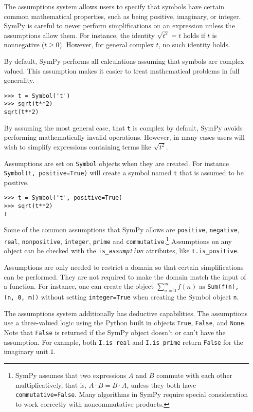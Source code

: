 The assumptions system allows users to specify that symbols have certain
common mathematical properties, such as being positive, imaginary, or
integer. SymPy is careful to never perform simplifications on an expression
unless the assumptions allow them. For instance, the identity $\sqrt{t^2} = t$
holds if $t$ is nonnegative ($t\ge 0$). However, for general complex $t$, no
such identity holds.

By default, SymPy performs all calculations assuming that symbols are
complex valued. This assumption makes it easier to treat mathematical problems
in full generality.
\begin{verbatim}
>>> t = Symbol('t')
>>> sqrt(t**2)
sqrt(t**2)
\end{verbatim}

By assuming the most general case, that \texttt{t} is complex by default, SymPy
avoids performing mathematically invalid operations. However, in many cases
users will wish to simplify expressions containing terms like $\sqrt{t^2}$.

Assumptions are set on \texttt{Symbol} objects when they are created. For
instance \texttt{Symbol(\textquotesingle{}t\textquotesingle{}, positive=True)} will create a symbol named
\texttt{t} that is assumed to be positive.
\begin{verbatim}
>>> t = Symbol('t', positive=True)
>>> sqrt(t**2)
t
\end{verbatim}

Some of the common assumptions that SymPy allows are \texttt{positive},
\texttt{negative}, \texttt{real}, \texttt{nonpositive}, \texttt{integer},
\texttt{prime} and \texttt{commutative}.\footnote{SymPy assumes that two
  expressions $A$ and $B$ commute with each other multiplicatively, that is,
  $A\cdot B=B\cdot A$, unless they both have \texttt{commutative=False}. Many
  algorithms in SymPy require special consideration to work correctly with
  noncommutative products.} Assumptions on any object can be checked with the
\verb|is_|\texttt{\textit{assumption}} attributes, like \verb|t.is_positive|.

Assumptions are only needed to restrict a domain so that certain
simplifications can be performed. They are not required to make the domain match
the input of a function. For instance, one can create the object
$\sum_{n=0}^m f(n)$ as \verb|Sum(f(n), (n, 0, m))| without setting
\texttt{integer=True} when creating the Symbol object \texttt{n}.

The assumptions system additionally has deductive capabilities. The
assumptions use a three-valued logic using the Python built in objects
\texttt{True}, \texttt{False}, and \texttt{None}. Note that \texttt{False}
is returned if the SymPy object doesn't or can't have the assumption.
For example, both \texttt{I.is\_real} and \texttt{I.is\_prime} return
\texttt{False} for the imaginary unit \texttt{I}.

